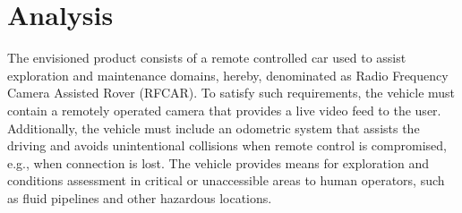 \chapter{Analysis}%
\label{ch:analysis}
The envisioned product consists of a remote controlled car used to assist
exploration and maintenance domains, hereby, denominated as Radio Frequency
Camera Assisted Rover (RFCAR). To satisfy such requirements, the vehicle must
contain a remotely operated camera that provides a live video feed to the user.
Additionally, the vehicle must include an odometric system that assists the
driving and avoids unintentional collisions when remote control is compromised, e.g., when connection is lost.
The vehicle provides means for exploration and conditions assessment in critical
or unaccessible areas to human operators, such as fluid pipelines and other
hazardous locations.
%

